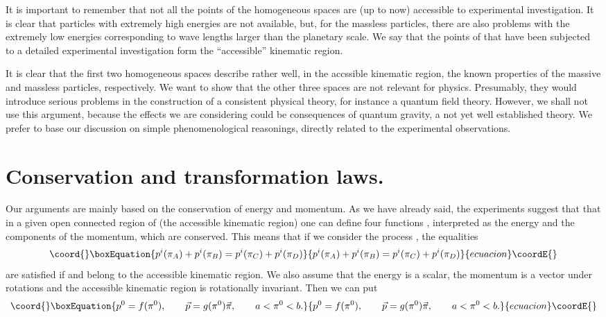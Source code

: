 \documentclass[a4paper,12pt]{article}
\begin{document}
It is important to remember that not all the points of the homogeneous spaces are (up to now) accessible to experimental investigation. It is clear that particles with extremely high energies are not available, but, for the massless particles, there are also problems with the extremely low energies corresponding to wave lengths larger than the planetary scale. We say that the points of \myHighlight{$\Pi$}\coordHE{} that have been subjected to a detailed experimental investigation form the ``accessible'' kinematic region.

It is clear that the first two homogeneous spaces describe rather well, in the accssible kinematic region, the known properties of the massive and massless particles, respectively. We want to show that the other three spaces are not relevant for physics. Presumably, they would introduce serious problems in the construction of a consistent physical theory, for instance a quantum field theory. However, we shall not use this argument, because the effects we are considering could be consequences of quantum gravity, a not yet well established theory. We prefer to base our discussion on simple phenomenological reasonings, directly related to the experimental observations.

\section{Conservation and transformation laws.}

Our arguments are mainly based on the conservation of energy and momentum. As we have already said, the experiments suggest that that in a given open connected region of \myHighlight{$\Pi$}\coordHE{} (the accessible kinematic region) one can define four functions \coordHE{}, interpreted as the energy and the components of the momentum, which are conserved. This means that if we consider the process \coordHE{}, the equalities 
\begin{equation}\coord{}\boxEquation{ \label{Cons}
p^i(\pi_A) + p^i(\pi_B) = p^i(\pi_C) + p^i(\pi_D)
}{ p^i(\pi_A) + p^i(\pi_B) = p^i(\pi_C) + p^i(\pi_D)
}{ecuacion}\coordE{}\end{equation}
are satisfied if \coordHE{} and \coordHE{} belong to the accessible kinematic region. We also assume that the energy \coordHE{} is a scalar, the momentum \coordHE{} is a vector under rotations and the accessible kinematic region is rotationally invariant. Then we can put
\begin{equation}\coord{}\boxEquation{ \label{EnMom}
p^0 = f(\pi^0), \qquad  \vec p = g(\pi^0) \vec\pi, \qquad a < \pi^0 < b.
}{ p^0 = f(\pi^0), \qquad  \vec p = g(\pi^0) \vec\pi, \qquad a < \pi^0 < b.
}{ecuacion}\coordE{}\end{equation}
\end{document}
